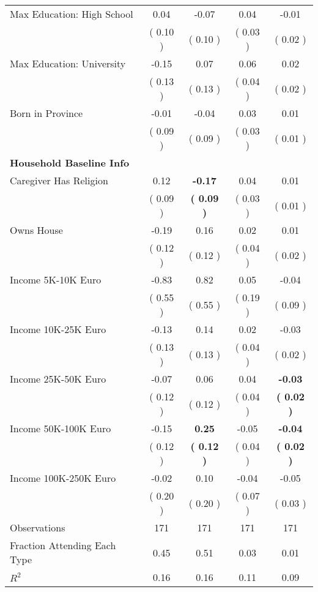 \begin{table}[H]
{\begin{tabular}{lcccc}
\quad Max Education: High School &      0.04 &     -0.07 &      0.04 &     -0.01 \\
\quad  & (     0.10 ) & (     0.10 )  & (     0.03 )  & (     0.02 )  \\
\quad Max Education: University &     -0.15 &      0.07 &      0.06 &      0.02 \\
\quad  & (     0.13 ) & (     0.13 )  & (     0.04 )  & (     0.02 )  \\
\quad Born in Province &     -0.01 &     -0.04 &      0.03 &      0.01 \\
\quad  & (     0.09 ) & (     0.09 )  & (     0.03 )  & (     0.01 )  \\
\midrule
\textbf{Household Baseline Info} \\
\quad Caregiver Has Religion &      0.12 & \textbf{    -0.17} &      0.04 &      0.01 \\
\quad  & (     0.09 ) & \textbf{(     0.09 )}  & (     0.03 )  & (     0.01 )  \\
\quad Owns House &     -0.19 &      0.16 &      0.02 &      0.01 \\
\quad  & (     0.12 ) & (     0.12 )  & (     0.04 )  & (     0.02 )  \\
\quad Income 5K-10K Euro &     -0.83 &      0.82 &      0.05 &     -0.04 \\
\quad  & (     0.55 ) & (     0.55 )  & (     0.19 )  & (     0.09 )  \\
\quad Income 10K-25K Euro &     -0.13 &      0.14 &      0.02 &     -0.03 \\
\quad  & (     0.13 ) & (     0.13 )  & (     0.04 )  & (     0.02 )  \\
\quad Income 25K-50K Euro &     -0.07 &      0.06 &      0.04 & \textbf{    -0.03} \\
\quad  & (     0.12 ) & (     0.12 )  & (     0.04 )  & \textbf{(     0.02 )}  \\
\quad Income 50K-100K Euro &     -0.15 & \textbf{     0.25} &     -0.05 & \textbf{    -0.04} \\
\quad  & (     0.12 ) & \textbf{(     0.12 )}  & (     0.04 )  & \textbf{(     0.02 )}  \\
\quad Income 100K-250K Euro &     -0.02 &      0.10 &     -0.04 &     -0.05 \\
\quad  & (     0.20 ) & (     0.20 )  & (     0.07 )  & (     0.03 )  \\
\midrule
Observations & 171 & 171 & 171 & 171 \\
Fraction Attending Each Type &      0.45 &      0.51 &      0.03 &      0.01 \\
\midrule
$ R^2$ &      0.16 &      0.16 &      0.11 &      0.09 \\
\bottomrule
\end{tabular}}
\end{table}
